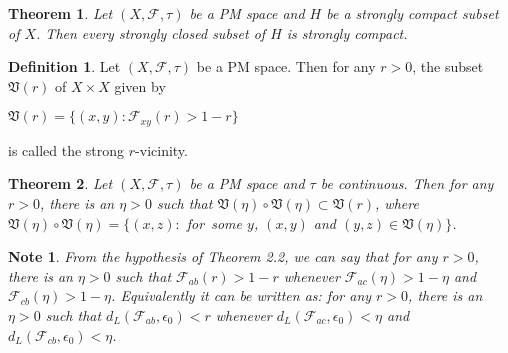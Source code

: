 \documentclass[reqno,b5paper]{amsart}
\theoremstyle{plain}
\newtheorem{thm}{Theorem}[section]
\newtheorem{note}{Note}[section]
\theoremstyle{definition}
\newtheorem{defn}{Definition}[section]
\begin{document}
\begin{thm}\cite{Du1}
Let $(X,\mathcal{F},\tau)$ be a PM space and $H$ be a strongly
compact subset of $X$. Then every strongly closed subset of $H$ is
strongly compact.
\end{thm}
\begin{defn}
Let $(X,\mathcal{F},\tau)$ be a PM space. Then for any $r>0$, the
subset $\mathfrak{V}(r)$ of $ X\times X$ given by
\begin{center}
$\mathfrak{V}(r)=\{ (x,y): \mathcal{F}_{xy} (r)>1-r\} $
\end{center}
is called the strong $r$-vicinity.
\end{defn}
\begin{thm}
Let $(X,\mathcal{F},\tau)$ be a PM space and $\tau $ be
continuous. Then for any $r>0$, there is an $\eta>0$ such that
$\mathfrak{V}(\eta)\circ\mathfrak{V}(\eta)\subset\mathfrak{V}(r)$,
where $\mathfrak{V}(\eta)\circ\mathfrak{V}(\eta)=\{(x,z):$
\mbox{for some} $y$, $(x,y)$ and $(y,z)\in \mathfrak{V}(\eta)\} $.
 \end{thm}
\begin{note}
From the hypothesis of Theorem 2.2, we can say that for any $r>0$,
there is an $\eta >0$ such that $\mathcal{F}_{ab}(r)>1-r$ whenever
$\mathcal{F}_{ac}(\eta)>1-\eta $ and
$\mathcal{F}_{cb}(\eta)>1-\eta$. Equivalently it can be written
as: for any $r>0$, there is an $\eta>0$ such that
$d_{L}(\mathcal{F}_{ab},\epsilon_{0})<r$ whenever
$d_{L}(\mathcal{F}_{ac},\epsilon_{0})<\eta$ and
$d_{L}(\mathcal{F}_{cb},\epsilon_{0})<\eta$.
 \end{note}
\end{document}
